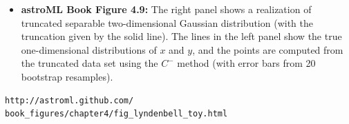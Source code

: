 \documentclass[letterpaper,landscape]{slides}
\begin{document}
\begin{slide}

\begin{itemize}
\item {\bf astroML Book Figure 4.9:} 
The right panel shows a realization of truncated separable two-dimensional 
Gaussian distribution (with the truncation given by the solid line).
The lines in the left panel show the true one-dimensional distributions of $x$ 
and $y$, and the points are computed from the truncated data set using the $C^-$ method
(with error bars from 20 bootstrap resamples). 
\end{itemize}

\begin{verbatim}
http://astroml.github.com/
book_figures/chapter4/fig_lyndenbell_toy.html
\end{verbatim} 
\vskip -0.7in
\phantom{x}

\vfill
\end{slide}
 
\end{document}
